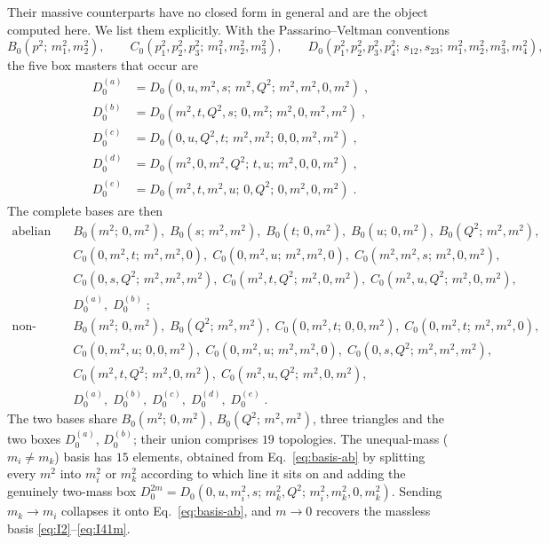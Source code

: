 \documentclass[11pt,a4paper]{article}
\newcommand{\Bz}[2]{B_0(#1;\,#2)}
\newcommand{\Cz}[2]{C_0(#1;\,#2)}
\newcommand{\Dzz}[1]{D_0^{(#1)}}
\begin{document}
Their massive counterparts have no closed form in general and are the object
computed here. We list them explicitly. With the Passarino--Veltman conventions
\begin{equation}
  \Bz{p^2}{m_1^2,m_2^2},\qquad
  \Cz{p_1^2,p_2^2,p_3^2}{m_1^2,m_2^2,m_3^2},\qquad
  D_0(p_1^2,p_2^2,p_3^2,p_4^2;\,s_{12},s_{23};\,m_1^2,m_2^2,m_3^2,m_4^2),
  \label{eq:pave-conventions}
\end{equation}
the five box masters that occur are
\begin{align}
  \Dzz{a}&=D_0(0,u,m^2,s;\,m^2,Q^2;\,m^2,m^2,0,m^2)\;, \label{eq:Da}\\
  \Dzz{b}&=D_0(m^2,t,Q^2,s;\,0,m^2;\,m^2,0,m^2,m^2)\;, \label{eq:Db}\\
  \Dzz{c}&=D_0(0,u,Q^2,t;\,m^2,m^2;\,0,0,m^2,m^2)\;, \label{eq:Dc}\\
  \Dzz{d}&=D_0(m^2,0,m^2,Q^2;\,t,u;\,m^2,0,0,m^2)\;, \label{eq:Dd}\\
  \Dzz{e}&=D_0(m^2,t,m^2,u;\,0,Q^2;\,0,m^2,0,m^2)\;. \label{eq:De}
\end{align}
The complete bases are then
\begin{align}
\text{abelian (13):}\quad
 &\Bz{m^2}{0,m^2},\;\Bz{s}{m^2,m^2},\;\Bz{t}{0,m^2},\;\Bz{u}{0,m^2},\;\Bz{Q^2}{m^2,m^2},\nonumber\\
 &\Cz{0,m^2,t}{m^2,m^2,0},\;\Cz{0,m^2,u}{m^2,m^2,0},\;\Cz{m^2,m^2,s}{m^2,0,m^2},\nonumber\\
 &\Cz{0,s,Q^2}{m^2,m^2,m^2},\;\Cz{m^2,t,Q^2}{m^2,0,m^2},\;\Cz{m^2,u,Q^2}{m^2,0,m^2},\nonumber\\
 &\Dzz{a},\;\Dzz{b}\;;
 \label{eq:basis-ab}\\[2mm]
\text{non-abelian (14):}\quad
 &\Bz{m^2}{0,m^2},\;\Bz{Q^2}{m^2,m^2},\;
   \Cz{0,m^2,t}{0,0,m^2},\;\Cz{0,m^2,t}{m^2,m^2,0},\nonumber\\
 &\Cz{0,m^2,u}{0,0,m^2},\;\Cz{0,m^2,u}{m^2,m^2,0},\;\Cz{0,s,Q^2}{m^2,m^2,m^2},\nonumber\\
 &\Cz{m^2,t,Q^2}{m^2,0,m^2},\;\Cz{m^2,u,Q^2}{m^2,0,m^2},\nonumber\\
 &\Dzz{a},\;\Dzz{b},\;\Dzz{c},\;\Dzz{d},\;\Dzz{e}\;.
 \label{eq:basis-nab}
\end{align}
The two bases share $\Bz{m^2}{0,m^2}$, $\Bz{Q^2}{m^2,m^2}$, three triangles and the
two boxes $\Dzz{a}$, $\Dzz{b}$; their union comprises $19$ topologies. The
unequal-mass ($m_i\neq m_k$) basis has $15$ elements, obtained from
Eq.~\eqref{eq:basis-ab} by splitting every $m^2$ into $m_i^2$ or $m_k^2$ according
to which line it sits on and adding the genuinely two-mass box
$D_0^{2m}=D_0(0,u,m_i^2,s;\,m_k^2,Q^2;\,m_i^2,m_k^2,0,m_k^2)$. Sending
$m_k\to m_i$ collapses it onto Eq.~\eqref{eq:basis-ab}, and $m\to0$ recovers the
massless basis \eqref{eq:I2}--\eqref{eq:I41m}.
\end{document}
